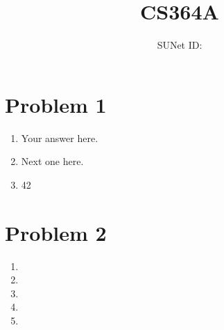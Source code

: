 \documentclass{article}
\title{CS364A \exerciseset}
\author{\studentname \qquad SUNet ID: \suid}
\begin{document}
\maketitle

\section*{Problem 1}
\begin{enumerate}
\item %
Your answer here.

\item %
Next one here.

\item %
42

\end{enumerate}

\section*{Problem 2}
\begin{enumerate}
\item %

\item %

\item %

\item %

\item %

\end{enumerate}
\end{document}
